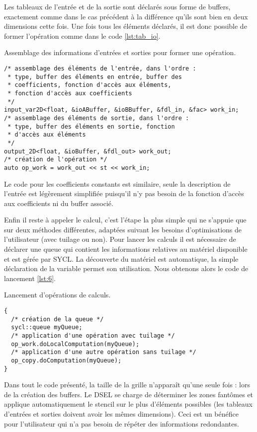 Les tableaux de l'entrée et de la sortie sont déclarés sous forme de buffers, exactement comme dans le cas précédent à la différence qu'ils sont bien en deux dimensions cette fois. Une fois tous les éléments déclarés, il est donc possible de former l'opération comme dans le code \ref{lst:tab_io}.
\begin{listing}[H]
\caption{Assemblage des informations d'entrées et sorties pour former une opération.}
\label{lst:tab_io}
\begin{verbatim}
/* assemblage des éléments de l'entrée, dans l'ordre :
 * type, buffer des éléments en entrée, buffer des 
 * coefficients, fonction d'accès aux éléments,
 * fonction d'accès aux coefficients
 */
input_var2D<float, &ioABuffer, &ioBBuffer, &fdl_in, &fac> work_in;
/* assemblage des éléments de sortie, dans l'ordre :
 * type, buffer des éléments en sortie, fonction
 * d'accès aux éléments
 */
output_2D<float, &ioBuffer, &fdl_out> work_out;
/* création de l'opération */
auto op_work = work_out << st << work_in;
\end{verbatim}
\end{listing}
Le code pour les coefficients constants est similaire, seule la description de l'entrée est légèrement simplifiée puisqu'il n'y pas besoin de la fonction d'accès aux coefficients ni du buffer associé. 

Enfin il reste à appeler le calcul, c'est l'étape la plus simple qui ne s'appuie que sur deux méthodes différentes, adaptées suivant les besoins d'optimisations de l'utilisateur (avec tuilage ou non). Pour lancer les calculs il est nécessaire de déclarer une queue qui contient les informations relatives au matériel disponible et est gérée par \textsf{SYCL}. La découverte du matériel est automatique, la simple déclaration de la variable permet son utilisation. Nous obtenons alors le code de lancement \ref{lst:6}.
\begin{listing}[H]
\caption{Lancement d'opérations de calculs.}
\label{lst:6}
\begin{verbatim}
{   
  /* création de la queue */
  sycl::queue myQueue; 
  /* application d'une opération avec tuilage */
  op_work.doLocalComputation(myQueue);
  /* application d'une autre opération sans tuilage */
  op_copy.doComputation(myQueue);
}
\end{verbatim}
\end{listing}

Dans tout le code présenté, la taille de la grille n'apparaît qu'une seule fois : lors de la création des buffers. Le DSEL se charge de déterminer les zones fantômes et applique automatiquement le stencil sur le plus d'éléments possibles (les tableaux d'entrées et sorties doivent avoir les mêmes dimensions). Ceci est un bénéfice pour l'utilisateur qui n'a pas besoin de répéter des informations redondantes. %

